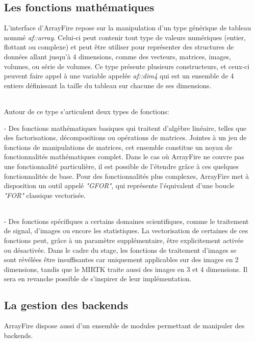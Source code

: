 \documentclass[10pt]{report}
\begin{document}
	\subsection{Les fonctions mathématiques}
	L'interface d'ArrayFire repose sur la manipulation d'un type générique de tableau nommé \textit{af::array}. Celui-ci peut contenir tout type de valeurs numériques (entier, flottant ou complexe) et peut être utiliser pour représenter des structures de données allant jusqu'à 4 dimensions, comme des vecteurs, matrices, images, volumes, ou série de volumes. Ce type présente plusieurs constructeurs, et ceux-ci peuvent faire appel à une variable appelée \textit{af::dim4} qui est un ensemble de 4 entiers définissant la taille du tableau sur chacune de ses dimensions.\\ ~\par 
	
	\noindent Autour de ce type s'articulent deux types de fonctions: ~\par 
	- Des fonctions mathématiques basiques qui traitent d'algèbre linéaire, telles que des factorisations, décompositions ou opérations de matrices. Jointes à un jeu de fonctions de manipulations de matrices, cet ensemble constitue un noyau de fonctionnalités mathématiques complet. Dans le cas où ArrayFire ne couvre pas une fonctionnalité particulière, il est possible de l'étendre grâce à ces quelques fonctionnalités de base. Pour des fonctionnalités plus complexes, ArrayFire met à disposition un outil appelé \textit{"GFOR"}, qui représente l'équivalent d'une boucle \textit{"FOR"} classique vectorisée. \\~\par 
	- Des fonctions spécifiques a certains domaines scientifiques, comme le traitement de signal, d'images ou encore les statistiques. La vectorisation de certaines de ces fonctions peut, grâce à un paramètre supplémentaire, être explicitement activée ou désactivée. Dans le cadre du stage, les fonctions de traitement d'images se sont révélées être insuffisantes car uniquement applicables sur des images en 2 dimensions, tandis que le MIRTK traite aussi des images en 3 et 4 dimensions. Il sera en revanche possible de s'inspirer de leur implémentation.
	\subsection{La gestion des backends}
	
	ArrayFire dispose aussi d'un ensemble de modules permettant de manipuler des backends. \\ ~\par
	
\end{document}
